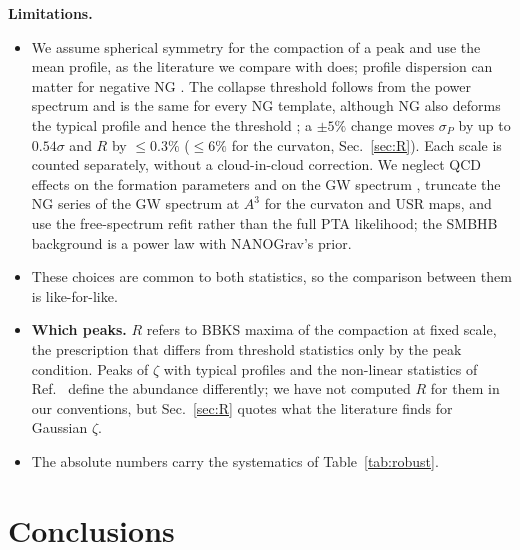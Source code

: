 \documentclass[11pt,a4paper]{article}
\begin{document}
\textbf{Limitations.}
\begin{itemize}
\item We assume spherical symmetry for the compaction of a peak \cite{Young22} and use the mean
profile, as the literature we compare with does; profile dispersion can matter for negative NG
\cite{Escriva26}. The collapse threshold follows from the power spectrum and is the same for
every NG template, although NG also deforms the typical profile and hence the threshold
\cite{KMR19,ETYY22}; a $\pm5\%$ change moves $\sigma_P$ by up to $0.54\sigma$ and $R$ by
$\le0.3\%$ ($\le6\%$ for the curvaton, Sec.~\ref{sec:R}). Each scale is counted separately, without a cloud-in-cloud correction. We
neglect QCD effects on the formation parameters \cite{MJY23,FMPU22} and on the GW spectrum
\cite{ATU21,BDF23}, truncate the NG series of
the GW spectrum at $A^3$ for the curvaton and USR maps, and use the free-spectrum refit rather
than the full PTA likelihood; the SMBHB background is a power law with NANOGrav's prior.
\item These choices are common to both statistics, so the comparison between them is
like-for-like.
\item \textbf{Which peaks.} $R$ refers to BBKS maxima of the compaction at fixed scale, the
prescription that differs from threshold statistics only by the peak condition. Peaks of $\zeta$
with typical profiles \cite{Yoo18,Yoo20,Kitajima} and the non-linear statistics of
Ref.~\cite{GS20} define the abundance differently; we have not computed $R$ for them in our
conventions, but Sec.~\ref{sec:R} quotes what the literature finds for Gaussian $\zeta$.
\item The absolute numbers carry the systematics of Table~\ref{tab:robust}.
\end{itemize}

\section{Conclusions}
\end{document}
